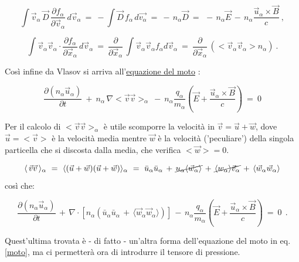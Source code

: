 \[ \int \vec v_\alpha\, \vec{D}\, \frac{\partial f_\alpha}{\partial \vec v_\alpha}\, d\vec v_\alpha\ =\ -\int \vec D\, f_\alpha\, d\vec{v_\alpha}\ =\ -\,n_{\alpha}\vec{D}\ =\ \, -\, n_{\alpha}\vec{E} \,-\, n_\alpha \frac{\vec u_\alpha \times \vec B}{c}\ ,\]

\[\int \vec v_\alpha \vec v_\alpha \cdot \frac{\partial f_\alpha}{\partial \vec x_\alpha} \, d\vec v_\alpha\ =\ \frac{\partial}{\partial \vec x_\alpha}\, \int \vec v_\alpha \vec v_\alpha f_\alpha d\vec v_\alpha\ =\ \frac{\partial}{\partial \vec x_\alpha}\, \left( <\vec v_\alpha \vec v_\alpha> n_\alpha \right)\ .
\]

Così infine da Vlasov si arriva all'\underline{equazione del moto} :

\begin{equation} 
	\label{moto 1}
	\boxed{\frac{\partial (n_\alpha \vec u_\alpha)}{\partial t}\ +\ n_\alpha\, \nabla <\vec v \vec v>_\alpha\ -\ n_\alpha \frac{q_\alpha}{m_\alpha} \left(\vec E + \frac{\vec u_\alpha \times \vec B}{c}\right)\ =\ 0 } 
\end{equation}

Per il calcolo di $<\vec v \vec v>_\alpha$ è utile scomporre la velocità in $\vec v = \vec u + \vec w$, dove $\vec u = <\vec v>$ è la velocità media mentre $\vec w$ è la velocità ('peculiare') della singola particella che si discosta dalla media, che verifica $<\vec w>=0$.

\[\langle\,\vec v \vec v\,\rangle_\alpha\ =\ \langle(\vec u + \vec w)(\vec u + \vec w)\rangle_\alpha\ =\ \bar u _\alpha \bar u_\alpha\, +\, \cancel{u_\alpha \langle \vec w_\alpha\rangle}\, +\, \cancel{\langle w_\alpha \rangle \vec v_\alpha}\, +\, \langle \vec w_\alpha \vec w_\alpha \rangle\]
così che:

\begin{equation}\label{moto}
	 \frac{\partial (n_\alpha \vec u_\alpha)}{\partial t}\, +\,  \nabla\cdot \left[n_\alpha \left( \bar u _\alpha \bar u_\alpha\, +\, \langle \vec w_\alpha \vec w_\alpha \rangle \right) \right]\, -\, n_\alpha\frac{q_\alpha}{m_\alpha} \left(\vec E + \frac{\vec u_\alpha \times \vec B}{c}\right)\ =\ 0\ \ .
\end{equation}

Quest'ultima trovata è - di fatto - un'altra forma dell'equazione del moto in eq.\ref{moto}, ma ci permetterà ora di introdurre il tensore di pressione.

